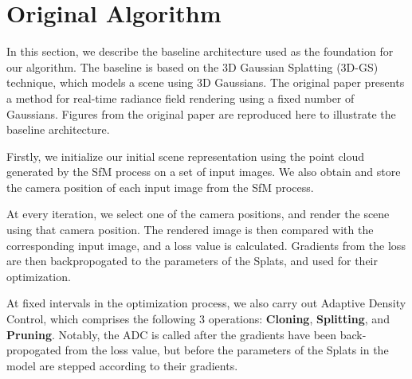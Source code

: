 \documentclass[11pt]{report}
\begin{document}
\section{Original Algorithm}
In this section, we describe the baseline architecture used as the foundation for our algorithm. The baseline is based on the 3D Gaussian Splatting (3D-GS) technique, which models a scene using 3D Gaussians. The original paper presents a method for real-time radiance field rendering using a fixed number of Gaussians. Figures from the original paper are reproduced here to illustrate the baseline architecture.

Firstly, we initialize our initial scene representation using the point cloud generated by the SfM process on a set of input images. We also obtain and store the camera position of each input image from the SfM process.

At every iteration, we select one of the camera positions, and render the scene using that camera position. The rendered image is then compared with the corresponding input image, and a loss value is calculated. Gradients from the loss are then backpropogated to the parameters of the Splats, and used for their optimization.

At fixed intervals in the optimization process, we also carry out Adaptive Density Control, which comprises the following 3 operations: \textbf{Cloning}, \textbf{Splitting}, and \textbf{Pruning}. Notably, the ADC is called after the gradients have been back-propogated from the loss value, but before the parameters of the Splats in the model are stepped according to their gradients.
\end{document}
